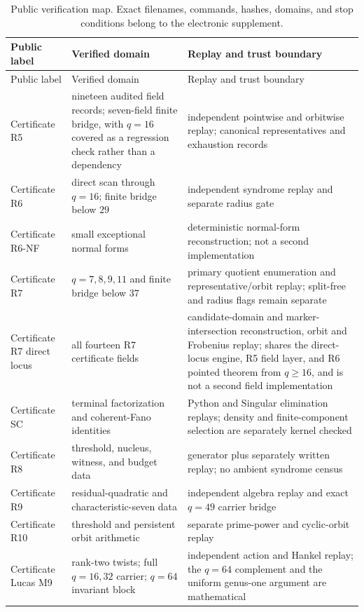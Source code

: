 \small
\begin{longtable}{>{\raggedright\arraybackslash}p{}
                  >{\raggedright\arraybackslash}p{}
                  >{\raggedright\arraybackslash}p{}}
\caption{Public verification map.  Exact filenames, commands, hashes,
domains, and stop conditions belong to the electronic supplement.}
\label{tab:evidence}\\
\toprule
Public label & Verified domain & Replay and trust boundary\\
\midrule
\endfirsthead
\toprule
Public label & Verified domain & Replay and trust boundary\\
\midrule
\endhead
\bottomrule
\endfoot
Certificate R5 & nineteen audited field records; seven-field finite
bridge, with \(q=16\) covered as a regression check rather than a
dependency & independent pointwise and orbitwise replay;
canonical representatives and exhaustion records\\
Certificate R6 & direct scan through $q=16$; finite bridge below $29$ &
independent syndrome replay and separate radius gate\\
Certificate R6-NF & small exceptional normal forms & deterministic
normal-form reconstruction; not a second implementation\\
Certificate R7 & $q=7,8,9,11$ and finite bridge below $37$ &
primary quotient enumeration and representative/orbit replay;
split-free and radius flags remain separate\\
Certificate R7 direct locus & all fourteen R7 certificate fields &
candidate-domain and marker-intersection reconstruction, orbit and
Frobenius replay; shares the direct-locus engine, R5 field layer, and
R6 pointed theorem from \(q\geq16\), and is not a second field
implementation\\
Certificate SC & terminal factorization and coherent-Fano identities &
Python and Singular elimination replays; density and finite-component
selection are separately kernel checked\\
Certificate R8 & threshold, nucleus, witness, and budget data &
generator plus separately written replay; no ambient syndrome census\\
Certificate R9 & residual-quadratic and characteristic-seven data &
independent algebra replay and exact \(q=49\) carrier bridge\\
Certificate R10 & threshold and persistent orbit arithmetic &
separate prime-power and cyclic-orbit replay\\
Certificate Lucas M9 & rank-two twists; full \(q=16,32\) carrier;
\(q=64\) invariant block & independent action and Hankel replay; the
\(q=64\) complement and the uniform genus-one argument are mathematical\\
\end{longtable}
\normalsize

